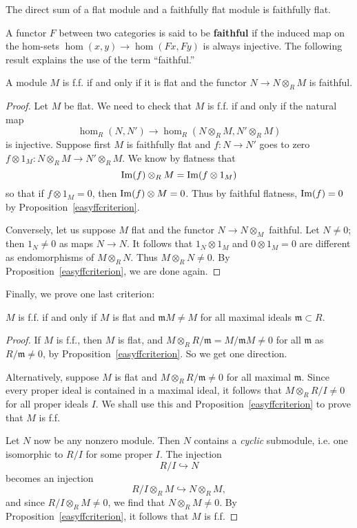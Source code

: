 \begin{exercise} 
The direct sum of a flat module and a faithfully flat module is faithfully flat.
\end{exercise} 

A functor $F$ between two categories is said to be \textbf{faithful} if the
induced map on the hom-sets $\hom(x,y) \to \hom(Fx, Fy)$ is always injective.
The following result explains the use of the term ``faithful.''

\begin{proposition} 
A module $M$ is f.f. if and only if it is flat and the functor $N \to N
\otimes_R M$ is faithful.
\end{proposition} 
\begin{proof} Let $M$ be flat.
We need to check that $M$ is f.f. if and only if the natural map
\[ \hom_R(N, N') \to \hom_R(N \otimes_R M, N' \otimes_R M)  \]
is injective.
Suppose first $M$ is faithfully flat and $f: N \to N'$ goes to zero $f \otimes
1_M: N \otimes_R M \to  N' \otimes_R M$. We know by flatness that
\[ \operatorname{Im}(f) \otimes_R M = \operatorname{Im}(f \otimes 1_M)  \]
so that if $f \otimes 1_M = 0$, then $\operatorname{Im}(f) \otimes M = 0$. Thus by faithful
flatness, $\operatorname{Im}(f) = 0$ by Proposition~\ref{easyffcriterion}.

Conversely, let us suppose $M$ flat and the functor $N \to N \otimes_M$
faithful. Let $N \neq 0$; then $1_N \neq 0$ as maps $N \to N$. 
It follows that $1_N \otimes 1_M$ and $0 \otimes 1_M = 0$ are different as
endomorphisms of $M \otimes_R N$. Thus $M \otimes_R N \neq 0$. By
Proposition~\ref{easyffcriterion}, we are done again.
\end{proof} 


Finally, we prove one last criterion:

\begin{proposition} \label{ffmaximal} 
$M$ is f.f. if and only if $M$ is flat and $\mathfrak{m}M \neq M$ for all
maximal ideals $\mathfrak{m} \subset R$.
\end{proposition} 
\begin{proof} 
If $M$ is f.f., then $M$ is flat, and $M \otimes_R R/\mathfrak{m} =
M/\mathfrak{m}M \neq 0$ for all $\mathfrak{m}$ as $R/\mathfrak{m} \neq 0$, by
Proposition~\ref{easyffcriterion}. So we get one direction.

Alternatively, suppose $M$ is flat and $M \otimes_R R/\mathfrak{m} \neq 0$ for
all maximal $\mathfrak{m}$. Since every proper ideal is contained in a maximal
ideal, it follows that $M \otimes_R R/I \neq 0$ for all proper ideals $I$. We
shall use this and Proposition~\ref{easyffcriterion} to prove that $M$ is f.f.

Let $N$ now be any nonzero module. Then $N$ contains a \emph{cyclic} submodule, i.e.
one isomorphic to $R/I$ for some proper $I$. The injection
\[ R/I \hookrightarrow N  \]
becomes an injection
\[ R/I \otimes_R M \hookrightarrow N \otimes_R M,  \]
and since $R/I \otimes_R M \neq 0$, we find that $N \otimes_R M \neq 0$. By
Proposition~\ref{easyffcriterion}, it follows that $M$ is f.f.
\end{proof} 

